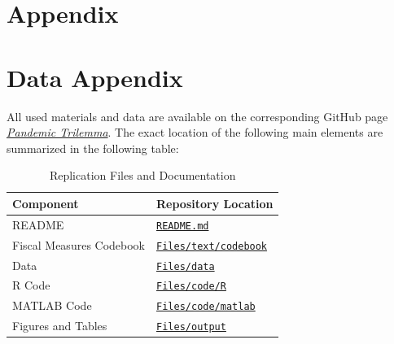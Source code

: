 \documentclass[12pt, a4paper]{article}
\begin{document}




\floatbarrier

\newpage
\section{Appendix}

\appendix

\section{Data Appendix}
\label{app:data}

All used materials and data are available on the corresponding GitHub page \href{https://github.com/pesentiA/Pandemic-Trilemma}
{\textit{Pandemic Trilemma}}. The exact location of the following main elements are summarized in the following table:
\begin{table}[H]
\centering
\caption{Replication Files and Documentation}
\label{tab:replication_files}
\renewcommand{\arraystretch}{1.25}

\begin{tabular}{@{}ll@{}}
\toprule
\textbf{Component} & \textbf{Repository Location} \\
\midrule
README
&
\href{https://github.com/pesentiA/Pandemic-Trilemma}
{\texttt{README.md}}
\\

Fiscal Measures Codebook
&
\href{https://github.com/pesentiA/Pandemic-Trilemma/tree/main/Files/text/codebook}
{\texttt{Files/text/codebook}}
\\

Data
&
\href{https://github.com/pesentiA/Pandemic-Trilemma/tree/main/Files/data}
{\texttt{Files/data}}
\\

R Code
&
\href{https://github.com/pesentiA/Pandemic-Trilemma/tree/main/Files/code/R}
{\texttt{Files/code/R}}
\\

MATLAB Code
&
\href{https://github.com/pesentiA/Pandemic-Trilemma/tree/main/Files/code/matlab}
{\texttt{Files/code/matlab}}
\\

Figures and Tables
&
\href{https://github.com/pesentiA/Pandemic-Trilemma/tree/main/Files/output}
{\texttt{Files/output}}
\\



\bottomrule
\end{tabular}
\end{table}
\end{document}

